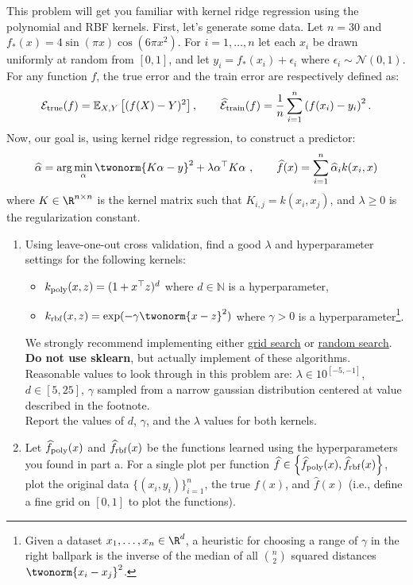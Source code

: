 \documentclass{article}
\begin{document}
\begin{aprob}
    This problem will get you familiar with kernel ridge regression using the polynomial and RBF kernels.
    First, let's generate some data. Let $n=30$ and $f_*(x) = 4 \sin(\pi x)\cos(6\pi x^2)$.
    For $i=1,\dots,n$ let each $x_i$ be drawn uniformly at random from $[0,1]$, and let $y_i = f_*(x_i) + \epsilon_i$ where $\epsilon_i \sim \mathcal{N}(0,1)$.
    For any function $f$, the true error and the train error are respectively defined as:
    $$\mathcal{E}_{\rm true}(f) = \mathbb{E}_{X,Y}\left[(f(X) - Y)^2\right], \quad \quad  \widehat{\mathcal{E}}_{\rm train}(f) =  \frac{1}{n} \sum_{i=1}^n \left(f(x_i)-y_i\right)^2.$$
    Now, our goal is, using kernel ridge regression, to construct a predictor:
    $$\widehat{\alpha} = \arg\min_\alpha \twonorm{K\alpha - y}^2 + \lambda \alpha^\top K \alpha \ , \quad \quad \widehat{f}(x) = \sum_{i=1}^n \widehat{\alpha}_i k(x_i,x)$$
    where $K\in\R^{n\times n}$ is the kernel matrix such that $K_{i,j} = k(x_i,x_j)$, and $\lambda\geq 0$ is the regularization constant.
    
    \begin{enumerate}
        \item {} Using leave-one-out cross validation, find a good $\lambda$ and hyperparameter settings for the following kernels:
        \begin{itemize}
            \item $k_{\rm poly}(x,z) = (1+x^\top z)^d$ where $d \in \mathbb{N}$ is a hyperparameter, 
            \item $k_{\rm rbf}(x,z) = \exp(-\gamma \twonorm{x-z}^2)$ where $\gamma > 0$ is a hyperparameter\footnote{Given a dataset $x_1,\dots,x_n \in \R^d$, a heuristic for choosing a range of $\gamma$ in the right ballpark is the inverse of the median of all $\binom{n}{2}$ squared distances $\twonorm{x_i-x_j}^2$.}.
        \end{itemize}
        We strongly recommend implementing either \href{https://en.wikipedia.org/wiki/Hyperparameter_optimization#Grid_search}{grid search} or \href{https://en.wikipedia.org/wiki/Hyperparameter_optimization#Random_search}{random search}. \textbf{Do not use sklearn}, but actually implement of these algorithms. Reasonable values to look through in this problem are: $\lambda \in 10^{[-5, -1]}$, $d \in [5, 25]$, $\gamma$ sampled from a narrow gaussian distribution centered at value described in the footnote. \\
        Report the values of $d$, $\gamma$, and the $\lambda$ values for both kernels.
        \item {} Let $\widehat{f}_{\rm poly}(x)$ and $\widehat{f}_{\rm rbf}(x)$ be the functions learned using the hyperparameters you found in part a.
        For a single plot per function $\widehat{f} \in \left\lbrace \widehat{f}_{\rm poly}(x), \widehat{f}_{\rm rbf}(x) \right\rbrace$, plot the original data $\{(x_i,y_i)\}_{i=1}^n$, the true $f(x)$, and $\widehat{f}(x)$ (i.e., define a fine grid on $[0,1]$ to plot the functions).
    \end{enumerate}

\end{aprob}
\end{document}
